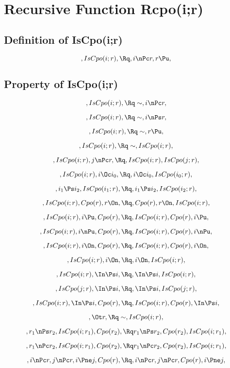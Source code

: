 \chapter{Recursive Function Rcpo(i;r)}

\section{Definition of IsCpo(i;r)}
\[,IsCpo(i;r), \Rq , i \nPc r, r \Pu, \]

\bigskip
\bigskip
\section{Property of IsCpo(i;r)}
\[,IsCpo(i;r), \Rq \sim, i \nPc r, \]

\[,IsCpo(i;r), \Rq \sim, i \nPs r, \]

\[,IsCpo(i;r), \Rq \sim, r \Pu, \]

\[,IsCpo(i;r), \Rq \sim, IsCpo(i;r), \]

\[,IsCpo(i;r), j \nPc r, \Rq , IsCpo(i;r), IsCpo(j;r),\]

\[, IsCpo(i;r), i \Oc i_0, \Rq , i \Oc i_0,  IsCpo(i_0;r),\]

\[, i_1 \Ps i_2, IsCpo(i_1;r), \Rq , i_1 \Ps i_2, IsCpo(i_2;r),\]


\[, IsCpo(i;r), Cpo(r), r\On , \Rq , Cpo(r), r \On, IsCpo(i;r),\]

\[, IsCpo(i;r), i \Pu, Cpo(r),  \Rq , IsCpo(i;r), Cpo(r), i \Pu,\]

\[, IsCpo(i;r), i \nPu, Cpo(r),  \Rq , IsCpo(i;r), Cpo(r), i \nPu,\]

\[, IsCpo(i;r), i \On, Cpo(r),  \Rq , IsCpo(i;r), Cpo(r), i \On,\]

\[, IsCpo(i;r), i \On,  \Rq , i \On, IsCpo(i;r),\]

\[, IsCpo(i;r), \In \Ps i, \Rq , \In \Ps i, IsCpo(i;r), \]

\[, IsCpo(j;r), \In \Ps i, \Rq , \In \Ps i, IsCpo(j;r), \]

\[, IsCpo(i;r), \In \Ps i, Cpo(r), \Rq , IsCpo(i;r), Cpo(r), \In \Ps i,\]

\[, \Ot r, \Rq \sim, IsCpo(i;r), \]

\[, r_1 \nPs r_2, IsCpo(i;r_1), Cpo(r_2), \Rq  r_1 \nPs r_2, Cpo(r_2), IsCpo(i;r_1),\]

\[, r_1 \nPc r_2, IsCpo(i;r_1), Cpo(r_2), \Rq  r_1 \nPc r_2, Cpo(r_2), IsCpo(i;r_1),\]

\[, i \nPc r, j \nPc r, i \Pne j, Cpo(r), \Rq , i \nPc r, j \nPc r, Cpo(r), i \Pne j, \]

